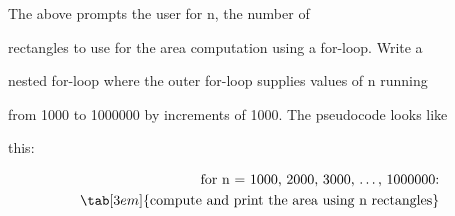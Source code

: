 The above prompts the user for n, the number of

rectangles to use for the area computation using a for-loop. Write a

nested for-loop where the outer for-loop supplies values of n running

from 1000 to 1000000 by increments of 1000. The pseudocode looks like

this:

\begin{align*}

\text{for n = 1000, 2000, 3000, \ldots, 1000000:}\\

\tab[3em]{\text{compute and print the area using n rectangles}}

\end{align*}

